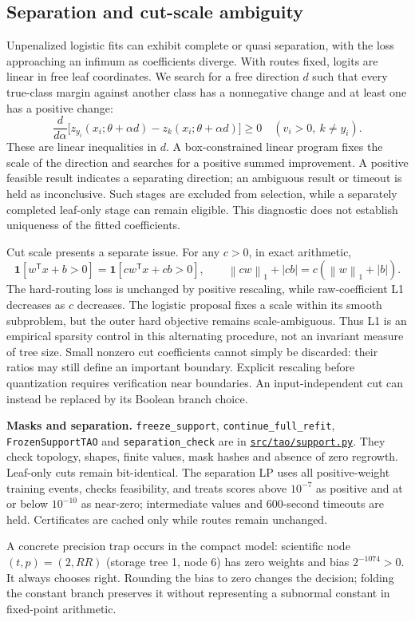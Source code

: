 \documentclass[11pt,a4paper]{article}
\newcommand{\code}[1]{{\small\texttt{\nolinkurl{#1}}}}
\newcommand{\file}[1]{\href{https://github.com/HephyAnalysisSW/oblique-tree-benchmark/blob/main/#1}{\nolinkurl{#1}}}
\newcommand{\ind}{\mathbf{1}}
\newcommand{\normone}[1]{\left\lVert #1\right\rVert_1}
\begin{document}
\subsection{Separation and cut-scale ambiguity}
Unpenalized logistic fits can exhibit complete or quasi separation, with the
loss approaching an infimum as coefficients diverge. With routes fixed, logits
are linear in free leaf coordinates. We search for a free direction $d$ such
that every true-class margin against another class has a nonnegative change
and at least one has a positive change:
\begin{equation}
 \frac{d}{d\alpha}\big[z_{y_i}(x_i;\theta+\alpha d)
              -z_k(x_i;\theta+\alpha d)\big]\geq0
 \quad(v_i>0,\ k\ne y_i).
 \label{eq:separation}
\end{equation}
These are linear inequalities in $d$. A box-constrained linear program fixes
the scale of the direction and searches for a positive summed improvement.
A positive feasible result indicates a separating direction; an ambiguous
result or timeout is held as inconclusive. Such stages are excluded from
selection, while a separately completed leaf-only stage can remain eligible.
This diagnostic does not establish uniqueness of the fitted coefficients.

Cut scale presents a separate issue. For any $c>0$, in exact arithmetic,
\begin{equation}
 \ind[w^{\mathsf T}x+b>0]=\ind[cw^{\mathsf T}x+cb>0],\qquad
 \normone{cw}+|cb|=c(\normone{w}+|b|).
 \label{eq:scale}
\end{equation}
The hard-routing loss is unchanged by positive rescaling, while raw-coefficient
L1 decreases as $c$ decreases. The logistic proposal fixes a scale within its
smooth subproblem, but the outer hard objective remains scale-ambiguous.
Thus L1 is an empirical sparsity control in this alternating procedure, not
an invariant measure of tree size. Small nonzero cut coefficients cannot
simply be discarded: their ratios may still define an important boundary.
Explicit rescaling before quantization requires verification near boundaries.
An input-independent cut can instead be replaced by its Boolean branch choice.

\begin{implementation}
\textbf{Masks and separation.} \code{freeze_support}, \code{continue_full_refit},
\code{FrozenSupportTAO} and \code{separation_check} are in
\file{src/tao/support.py}. They check topology, shapes, finite values, mask
hashes and absence of zero regrowth. Leaf-only cuts remain bit-identical.
The separation LP uses all positive-weight training events, checks feasibility,
and treats scores above $10^{-7}$ as positive and at or below $10^{-10}$ as
near-zero; intermediate values and 600-second timeouts are held. Certificates
are cached only while routes remain unchanged.

A concrete precision trap occurs in the compact model: scientific node
$(t,p)=(2,RR)$ (storage tree 1, node 6) has zero weights and bias $2^{-1074}>0$.
It always chooses right. Rounding the bias to zero changes the decision; folding
the constant branch preserves it without representing a subnormal constant
in fixed-point arithmetic.
\end{implementation}
\end{document}
